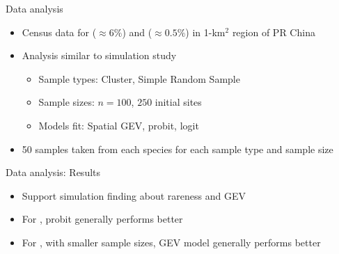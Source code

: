 \documentclass{beamer}
\begin{document}
\begin{frame}{Data analysis}
	\begin{itemize}\setlength{\itemsep}{1em}
		\item Census data for \tamarix{} ($\approx 6\%$) and \hedysarum{} ($\approx 0.5\%$) in 1-km$^2$ region of PR China
		\item Analysis similar to simulation study
		\begin{itemize} \setlength{\itemsep}{0.5em}
			\item Sample types: Cluster, Simple Random Sample
			\item Sample sizes: $n = 100$, $250$ initial sites
			\item Models fit: Spatial GEV, probit, logit
		\end{itemize}
		\item 50 samples taken from each species for each sample type and sample size
	\end{itemize}
\end{frame}

\begin{frame}{Data analysis: Results}
	\begin{itemize} \setlength{\itemsep}{1em}
		\item Support simulation finding about rareness and GEV
		\item For \hedysarum{}, probit generally performs better
		\item For \tamarix{}, with smaller sample sizes, GEV model generally performs better
	\end{itemize}
\end{frame}
\end{document}
